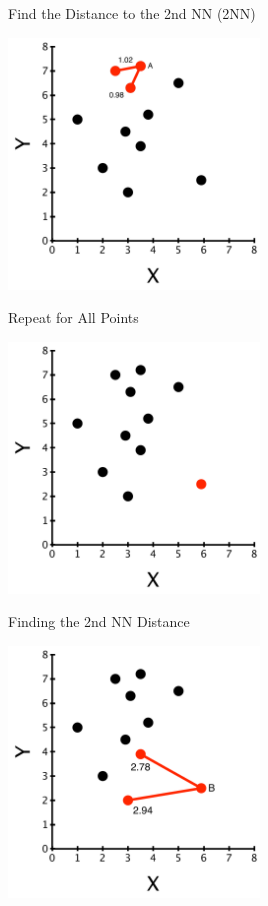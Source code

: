 \documentclass[aspectratio=169]{beamer}
\begin{document}
\begin{frame}{Find the Distance to the 2nd NN (2NN)}

\includegraphics[width=0.5\textwidth]{lectOutliers/outliersPtsA2NN.pdf}

\end{frame}
\begin{frame}{Repeat for All Points}

\includegraphics[width=0.5\textwidth]{lectOutliers/outliersPtsO1.pdf}
\end{frame}
\begin{frame}{Finding the 2nd NN Distance}

\includegraphics[width=0.5\textwidth]{lectOutliers/outliersPtsO2.pdf}
\end{frame}
\end{document}
